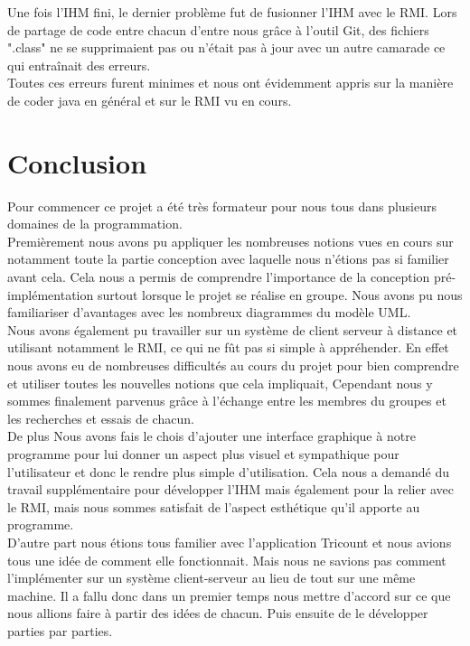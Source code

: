 \documentclass[12,french]{report}
\begin{document}
Une fois l'IHM fini, le dernier problème fut de fusionner l'IHM avec le RMI. Lors de partage de code entre chacun d'entre nous grâce à l'outil Git, des fichiers ".class" ne se supprimaient pas ou n'était pas à jour avec un autre camarade ce qui entraînait des erreurs.\\

Toutes ces erreurs furent minimes et nous ont évidemment appris sur la manière de coder java en général et sur le RMI vu en cours.


\chapter*{Conclusion}

Pour commencer ce projet a été très formateur pour nous tous dans plusieurs domaines de la programmation.\\

Premièrement nous avons pu appliquer les nombreuses notions vues en cours sur notamment toute la partie conception avec laquelle nous n'étions pas si familier avant cela. Cela nous a permis de comprendre l'importance de la conception pré-implémentation surtout lorsque le projet se réalise en groupe. Nous avons pu nous familiariser d'avantages avec les nombreux diagrammes du modèle UML.\\
Nous avons également pu travailler sur un système de client serveur à distance et utilisant notamment le RMI, ce qui ne fût pas si simple à appréhender. En effet nous avons eu de nombreuses difficultés au cours du projet pour bien comprendre et utiliser toutes les nouvelles notions que cela impliquait, Cependant nous y sommes finalement parvenus grâce à l'échange entre les membres du groupes et les recherches et essais de chacun.\\
De plus Nous avons fais le chois d'ajouter une interface graphique à notre programme pour lui donner un aspect plus visuel et sympathique pour l'utilisateur et donc le rendre plus simple d'utilisation. Cela nous a demandé du travail supplémentaire pour développer l'IHM mais également pour la relier avec le RMI, mais nous sommes satisfait de l'aspect esthétique qu'il apporte au programme.\\

D'autre part nous étions tous familier avec l'application Tricount et nous avions tous une idée de comment elle fonctionnait. Mais nous ne savions pas comment l'implémenter sur un système client-serveur au lieu de tout sur une même machine. Il a fallu donc dans un premier temps nous mettre d'accord sur ce que nous allions faire à partir des idées de chacun. Puis ensuite de le développer parties par parties.\\
\end{document}
